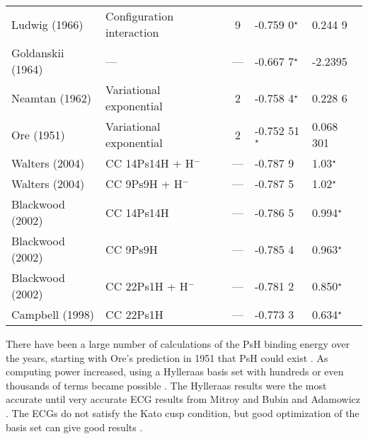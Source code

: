 \documentclass[Dissertation.tex]{subfiles}
\begin{document}
\begin{center}
\begin{longtable}{l l c l l}
Ludwig (1966) \cite{Ludwig1966} & Configuration interaction & 9 & -0.759 0$^\star$ & 0.244 9 \\*
Goldanskii (1964) \cite{Clary1976} & --- & --- & -0.667 7$^\star$ & -2.2395 \\*
Neamtan (1962) \cite{Neamtan1962} & Variational exponential & 2 & -0.758 4$^\star$ & 0.228 6 \\*
Ore (1951) \cite{Ore1951} & Variational exponential & 2 & -0.752 51$^\star$ & 0.068 301 \\*
Walters (2004) \cite{Walters2004} & CC 14Ps14H + H$^-$ & --- & -0.787 9 & 1.03$^\star$\\*
Walters (2004) \cite{Walters2004} & CC 9Ps9H + H$^-$ & --- & -0.787 5 & 1.02$^\star$\\*
Blackwood (2002) \cite{Blackwood2002} & CC 14Ps14H & --- & -0.786 5  & 0.994$^\star$ \\*
Blackwood (2002) \cite{Blackwood2002} & CC 9Ps9H & --- & -0.785 4 & 0.963$^\star$ \\*
Blackwood (2002) \cite{Blackwood2002b} & CC 22Ps1H + H$^-$ & --- & -0.781 2 & 0.850$^\star$ \\*
Campbell (1998) \cite{Campbell1998} & CC 22Ps1H & --- & -0.773 3 & 0.634$^\star$ \\*
\bottomrule
\end{longtable}
\end{center}



There have been a large number of calculations of the PsH binding energy over the years, starting with Ore's prediction in 1951 that PsH could exist \cite{Ore1951}. As computing power increased, using a Hylleraas basis set with hundreds or even thousands of terms became possible \cite{Ho1978,Ho1986,Yan1999,VanReeth2003}. The Hylleraas results were the most accurate until very accurate ECG results from Mitroy \cite{Mitroy2006} and Bubin and Adamowicz \cite{Bubin2004,Bubin2006}. The ECGs do not satisfy the Kato cusp condition, but good optimization of the basis set can give good results \cite{Mitroy2013}.
\end{document}
